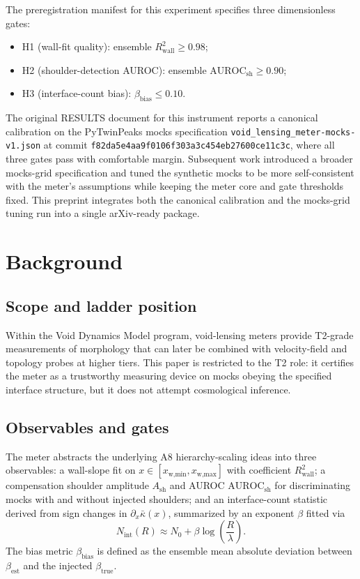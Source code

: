 \documentclass{article}
\begin{document}
The preregistration manifest for this experiment specifies three
dimensionless gates:

\begin{itemize}
  \item H1 (wall-fit quality): ensemble $R^2_{\text{wall}} \ge 0.98$;
  \item H2 (shoulder-detection AUROC): ensemble
    $\mathrm{AUROC}_{\text{sh}} \ge 0.90$;
  \item H3 (interface-count bias):
    $\beta_{\text{bias}} \le 0.10$.
\end{itemize}

The original RESULTS document for this instrument reports a canonical
calibration on the PyTwinPeaks mocks specification
\texttt{void\_lensing\_meter-mocks-v1.json} at commit
\texttt{f82da5e4aa9f0106f303a3c454eb27600ce11c3c},
where all three gates pass with comfortable margin.
Subsequent work introduced a broader mocks-grid specification and
tuned the synthetic mocks to be more self-consistent with the meter's
assumptions while keeping the meter core and gate thresholds fixed.
This preprint integrates both the canonical calibration and the
mocks-grid tuning run into a single arXiv-ready package.

\section{Background}
\subsection*{Scope and ladder position}
Within the Void Dynamics Model program, void-lensing meters provide
T2-grade measurements of morphology that can later be combined with
velocity-field and topology probes at higher tiers.
This paper is restricted to the T2 role: it certifies the meter as a
trustworthy measuring device on mocks obeying the specified interface
structure, but it does not attempt cosmological inference.

\subsection*{Observables and gates}
The meter abstracts the underlying A8 hierarchy-scaling ideas into
three observables:
a wall-slope fit on $x\in[x_{\text{w,min}},x_{\text{w,max}}]$ with
coefficient $R^2_{\text{wall}}$;
a compensation shoulder amplitude $A_{\text{sh}}$ and AUROC
$\mathrm{AUROC}_{\text{sh}}$ for discriminating mocks with and without
injected shoulders;
and an interface-count statistic derived from sign changes in
$\partial_x \bar{\kappa}(x)$, summarized by an exponent $\beta$
fitted via
\begin{equation}
N_{\text{int}}(R) \approx N_0 + \beta \log\!\left(\frac{R}{\lambda}\right).
\end{equation}
The bias metric $\beta_{\text{bias}}$ is defined as the ensemble mean
absolute deviation between $\beta_{\text{est}}$ and the injected
$\beta_{\text{true}}$.
\end{document}
